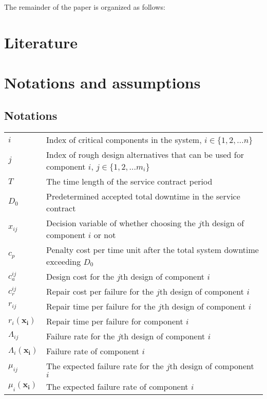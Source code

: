 \documentclass[preprint,12pt]{elsarticle}
\begin{document}
The remainder of the paper is organized as follows:

\section{Literature}

\section{Notations and assumptions}
 \subsection{Notations}
   \begin{tabular}{l l}
$i$ & Index of critical components in the system, $i \in \{1,2,...n\}$\\
$j$ & Index of rough design alternatives that can be used for component $i$, $j \in \{1,2,...m_{i}\}$\\
$T$ & The time length of the service contract period\\
$D_0$ & Predetermined accepted total downtime in the service contract\\
$x_{ij}$ & Decision variable of whether choosing the $j$th design of component $i$ or not\\
$c_p$ & Penalty cost per time unit after the total system downtime exceeding $D_0$\\
$c^{ij}_{a}$ & Design cost for the $j$th design of component $i$\\
$c_r^{ij}$ & Repair cost per failure for the $j$th design of component $i$\\
$r_{ij}$ & Repair time per failure for the $j$th design of component $i$\\
$r_{i}(\boldsymbol{x_{i}})$ & Repair time per failure for component $i$\\
$\Lambda_{ij}$ & Failure rate for the $j$th design of component $i$\\
$\Lambda_{i}(\boldsymbol{x_{i}})$  & Failure rate of component $i$\\
$\mu_{ij}$ & The expected failure rate for the $j$th design of component $i$ \\
$\mu_{i}(\boldsymbol{x_{i}})$ & The expected failure rate of component $i$ \\

\end{tabular}
\end{document}
